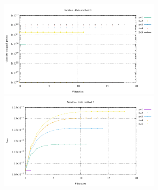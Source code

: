 \begin{center}
\includegraphics[width=7.8cm]{python_codes/fieldstone_87/results/experiment_07/stats_etaq_meth3.pdf}
\includegraphics[width=7.8cm]{python_codes/fieldstone_87/results/experiment_07/vrms_meth3.pdf}
\end{center}


